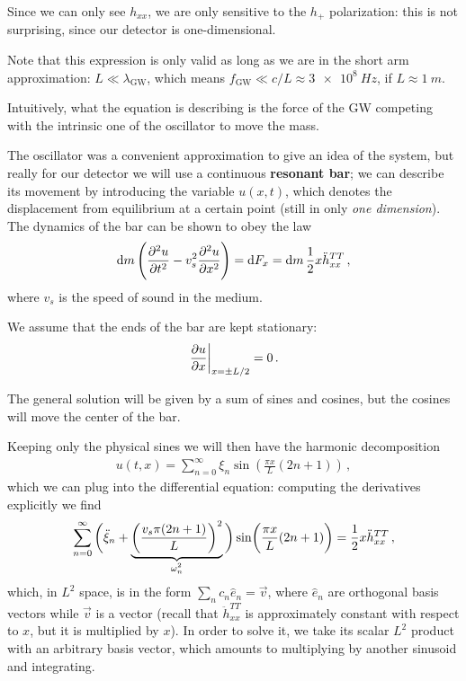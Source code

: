\documentclass[main.tex]{subfiles}
\begin{document}
Since we can only see \(h_{xx}\), we are only sensitive to the \(h_{+}\) polarization: this is not surprising, since our detector is one-dimensional. 

Note that this expression is only valid as long as we are in the short arm approximation: \(L \ll \lambda _{\text{GW}}\), which means \(f _{\text{GW}} \ll c/ L \approx \SI{3e8}{Hz}\), if \(L \approx \SI{1}{m}\). 

Intuitively, what the equation is describing is the force of the GW competing with the intrinsic one of the oscillator to move the mass.

The oscillator was a convenient approximation to give an idea of the system, but really for our detector we will use a continuous \textbf{resonant bar}; we can describe its movement by introducing the variable \(u(x, t)\), which denotes the displacement from equilibrium at a certain point (still in only \emph{one dimension}). The dynamics of the bar can be shown to obey the law
%
\begin{align}
\dd{m} \qty(\pdv[2]{u}{t} - v_s^2 \pdv[2]{u}{x}) = \dd{F_x} = \dd{m} \frac{1}{2} x \ddot{h}_{xx}^{TT}
\,,
\end{align}
%
where \(v_s\) is the speed of sound in the medium. 

We assume that the ends of the bar are kept stationary:
%
\begin{align}
\eval{\pdv{u}{x}}_{x = \pm L/2} = 0
\,.
\end{align}

The general solution will be given by a sum of sines and cosines, but the cosines will move the center of the bar. 


Keeping only the physical sines we will then have the harmonic decomposition
%
\begin{align}
u(t, x) = \sum _{n=0}^{ \infty } \xi_{n} \sin( \frac{\pi x}{L} (2 n + 1))
\,,
\end{align}
%
which we can plug into the differential equation: computing the derivatives explicitly we find 
%
\begin{align}
\sum _{n=0}^{ \infty } \bigg(\ddot{\xi}_{n} + \underbrace{\qty( \frac{v_s \pi (2n+1)}{L})^2}_{\mathclap{\omega_{n}^2}}\bigg) \sin( \frac{\pi x}{L} (2 n+1)) = \frac{1}{2} x \ddot{h}^{TT}_{xx}
\,,
\end{align}
%
which, in \(L^2\) space, is in the form \(\sum _{n} c_n \hat{e}_{n} = \vec{v}\), where \(\hat{e}_n\) are orthogonal basis vectors while \(\vec{v}\) is a vector (recall that \(\ddot{h}_{xx}^{TT}\) is approximately  constant with respect to \(x\), but it is multiplied by \(x\)).
In order to solve it, we take its scalar \(L^2\) product with an arbitrary basis vector, which amounts to multiplying by another sinusoid and integrating. 
\end{document}
